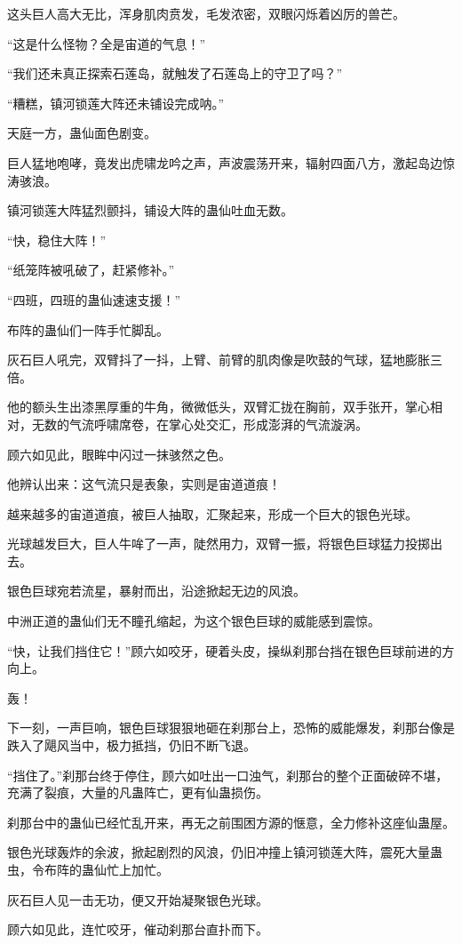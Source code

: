 \begin{this_body}
这头巨人高大无比，浑身肌肉贲发，毛发浓密，双眼闪烁着凶厉的兽芒。

“这是什么怪物？全是宙道的气息！”

“我们还未真正探索石莲岛，就触发了石莲岛上的守卫了吗？”

“糟糕，镇河锁莲大阵还未铺设完成呐。”

天庭一方，蛊仙面色剧变。

巨人猛地咆哮，竟发出虎啸龙吟之声，声波震荡开来，辐射四面八方，激起岛边惊涛骇浪。

镇河锁莲大阵猛烈颤抖，铺设大阵的蛊仙吐血无数。

“快，稳住大阵！”

“纸笼阵被吼破了，赶紧修补。”

“四班，四班的蛊仙速速支援！”

布阵的蛊仙们一阵手忙脚乱。

灰石巨人吼完，双臂抖了一抖，上臂、前臂的肌肉像是吹鼓的气球，猛地膨胀三倍。

他的额头生出漆黑厚重的牛角，微微低头，双臂汇拢在胸前，双手张开，掌心相对，无数的气流呼啸席卷，在掌心处交汇，形成澎湃的气流漩涡。

顾六如见此，眼眸中闪过一抹骇然之色。

他辨认出来：这气流只是表象，实则是宙道道痕！

越来越多的宙道道痕，被巨人抽取，汇聚起来，形成一个巨大的银色光球。

光球越发巨大，巨人牛哞了一声，陡然用力，双臂一振，将银色巨球猛力投掷出去。

银色巨球宛若流星，暴射而出，沿途掀起无边的风浪。

中洲正道的蛊仙们无不瞳孔缩起，为这个银色巨球的威能感到震惊。

“快，让我们挡住它！”顾六如咬牙，硬着头皮，操纵刹那台挡在银色巨球前进的方向上。

轰！

下一刻，一声巨响，银色巨球狠狠地砸在刹那台上，恐怖的威能爆发，刹那台像是跌入了飓风当中，极力抵挡，仍旧不断飞退。

“挡住了。”刹那台终于停住，顾六如吐出一口浊气，刹那台的整个正面破碎不堪，充满了裂痕，大量的凡蛊阵亡，更有仙蛊损伤。

刹那台中的蛊仙已经忙乱开来，再无之前围困方源的惬意，全力修补这座仙蛊屋。

银色光球轰炸的余波，掀起剧烈的风浪，仍旧冲撞上镇河锁莲大阵，震死大量蛊虫，令布阵的蛊仙忙上加忙。

灰石巨人见一击无功，便又开始凝聚银色光球。

顾六如见此，连忙咬牙，催动刹那台直扑而下。


\end{this_body}
